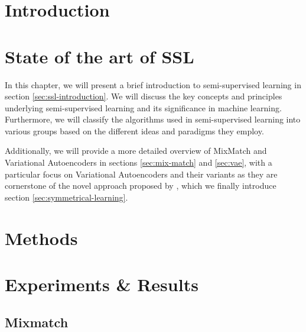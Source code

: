 \documentclass[twoside]{ctuthesis}
\theoremstyle{plain}
\theoremstyle{definition}
\theoremstyle{note}
\begin{document}
\maketitle

\chapter{Introduction}


\chapter{State of the art of SSL}
\label{motivation-theory}
In this chapter, we will present a brief introduction to semi-supervised learning in section \ref{sec:ssl-introduction}. 
We will discuss the key concepts and principles underlying semi-supervised learning and its significance in machine learning. 
Furthermore, we will classify the algorithms used in semi-supervised learning into various groups based on the different 
ideas and paradigms they employ.

Additionally, we will provide a more detailed overview of MixMatch and Variational Autoencoders in sections \ref{sec:mix-match} and \ref{sec:vae}, with
a particular focus on Variational Autoencoders and their variants as they are cornerstone of the novel approach proposed by \cite{sym-learning-2023}, which 
we finally introduce section \ref{sec:symmetrical-learning}.






\chapter{Methods}
\label{methods}






\chapter{Experiments \& Results} 

\section{Mixmatch}
\end{document}
